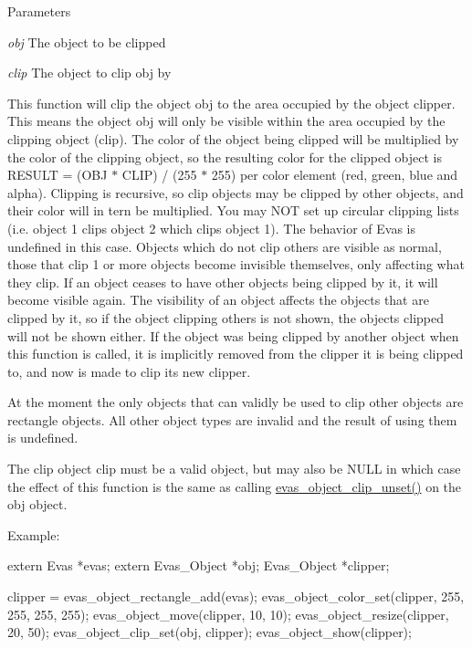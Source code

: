 \begin{DoxyParams}{Parameters}
\item[{\em obj}]The object to be clipped \item[{\em clip}]The object to clip {\ttfamily obj} by\end{DoxyParams}
This function will clip the object {\ttfamily obj} to the area occupied by the object {\ttfamily clipper}. This means the object {\ttfamily obj} will only be visible within the area occupied by the clipping object ({\ttfamily clip}). The color of the object being clipped will be multiplied by the color of the clipping object, so the resulting color for the clipped object is RESULT = (OBJ $\ast$ CLIP) / (255 $\ast$ 255) per color element (red, green, blue and alpha). Clipping is recursive, so clip objects may be clipped by other objects, and their color will in tern be multiplied. You may NOT set up circular clipping lists (i.e. object 1 clips object 2 which clips object 1). The behavior of Evas is undefined in this case. Objects which do not clip others are visible as normal, those that clip 1 or more objects become invisible themselves, only affecting what they clip. If an object ceases to have other objects being clipped by it, it will become visible again. The visibility of an object affects the objects that are clipped by it, so if the object clipping others is not shown, the objects clipped will not be shown either. If the object was being clipped by another object when this function is called, it is implicitly removed from the clipper it is being clipped to, and now is made to clip its new clipper.

At the moment the only objects that can validly be used to clip other objects are rectangle objects. All other object types are invalid and the result of using them is undefined.

The clip object {\ttfamily clip} must be a valid object, but may also be NULL in which case the effect of this function is the same as calling \hyperlink{group__Evas__Object__Group__Basic_gaa7fcd13f310444d7c1541b4fd31fa7f8}{evas\_\-object\_\-clip\_\-unset()} on the {\ttfamily obj} object.

Example: 
\begin{DoxyCode}
 extern Evas *evas;
 extern Evas_Object *obj;
 Evas_Object *clipper;

 clipper = evas_object_rectangle_add(evas);
 evas_object_color_set(clipper, 255, 255, 255, 255);
 evas_object_move(clipper, 10, 10);
 evas_object_resize(clipper, 20, 50);
 evas_object_clip_set(obj, clipper);
 evas_object_show(clipper);
\end{DoxyCode}
 

